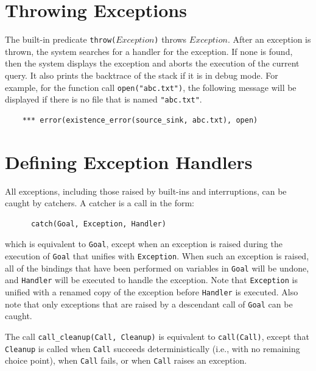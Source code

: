 \section{Throwing Exceptions}
The built-in predicate \texttt{throw($Exception$)}  throws $Exception$. After an exception is thrown, the system searches for a handler for the exception. If none is found, then the system displays the exception and aborts the execution of the current query. It also prints the backtrace of the stack if it is in debug mode. For example, for the function call \texttt{open("abc.txt")}, the following message will be displayed if there is no file that is named \texttt{"abc.txt"}.
\begin{verbatim}
    *** error(existence_error(source_sink, abc.txt), open)
\end{verbatim}

\section{Defining Exception Handlers}
All exceptions, including those raised by built-ins and interruptions, can be caught by catchers. A catcher is a call in the form:
\begin{verbatim}
      catch(Goal, Exception, Handler)
\end{verbatim}
which is equivalent to \texttt{Goal}, except when an exception is raised during the execution of \texttt{Goal} that unifies with \texttt{Exception}. When such an exception is raised, all of the bindings that have been performed on variables in \texttt{Goal} will be undone, and \texttt{Handler} will be executed to handle the exception. Note that \texttt{Exception} is unified with a renamed copy of the exception before \texttt{Handler} is executed. Also note that only exceptions that are raised by a descendant call of \texttt{Goal} can be caught.

The call \texttt{call\_cleanup(Call, Cleanup)} is equivalent to \texttt{call(Call)}, except that \texttt{Cleanup} is called when \texttt{Call} succeeds deterministically (i.e., with no remaining choice point), when \texttt{Call} fails, or when \texttt{Call} raises an exception.

